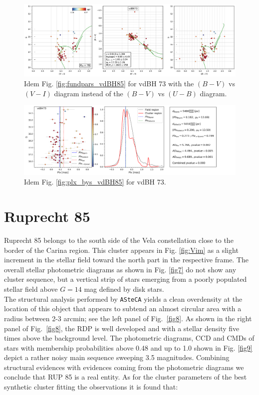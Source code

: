 \documentclass[draft]{aa}
\begin{document}
\begin{figure}[ht]
    \centering
    \includegraphics[width=\hsize]{../figs/cmds_vdBH73.png}
\caption{Idem Fig. \ref{fig:fundpars_vdBH85} for vdBH 73 with the $(B-V)$ vs
$(V-I)$ diagram instead of the $(B-V)$ vs $(U-B)$ diagram.}
    \label{fig:fundpars_vdBH73}
\end{figure}

\begin{figure}[ht]
    \centering
    \includegraphics[width=\hsize]{../figs/plx_vdBH73.png}
\caption{Idem Fig. \ref{fig:plx_bys_vdBH85} for vdBH 73.}
\label{fig:plx_bys_vdBH73}
\end{figure}




\section{Ruprecht 85}

Ruprecht 85 belongs to the south side of the Vela constellation close to the
border of the Carina region. This cluster appears in Fig. \ref{fig:Vim} as a
slight increment in the stellar field toward the north part in the respective
frame.
The overall stellar photometric diagrams as shown in Fig. \ref{fig7} do not show any cluster sequence, but a vertical strip of stars emerging from
a poorly populated stellar field above $G=14$ mag defined by disk stars.\\

The structural analysis performed by \texttt{ASteCA} yields a clean overdensity
at the location of this object that appears to subtend an almost circular area
with a radius between 2-3 arcmin; see the left panel of Fig.~\ref{fig8}.
As shown in the right panel of Fig.~\ref{fig8}, the RDP is well developed
and with a stellar density five times above the background level. The
photometric diagrams, CCD and CMDs of stars with membership probabilities above
0.48 and up to 1.0 shown in Fig. \ref{fig9} depict a rather noisy main
sequence sweeping 3.5 magnitudes.
Combining structural evidences with evidences coming from the photometric
diagrams we conclude that RUP 85 is a real entity. As for the cluster
parameters of the best synthetic cluster fitting the observations it is found
that:
\end{document}

